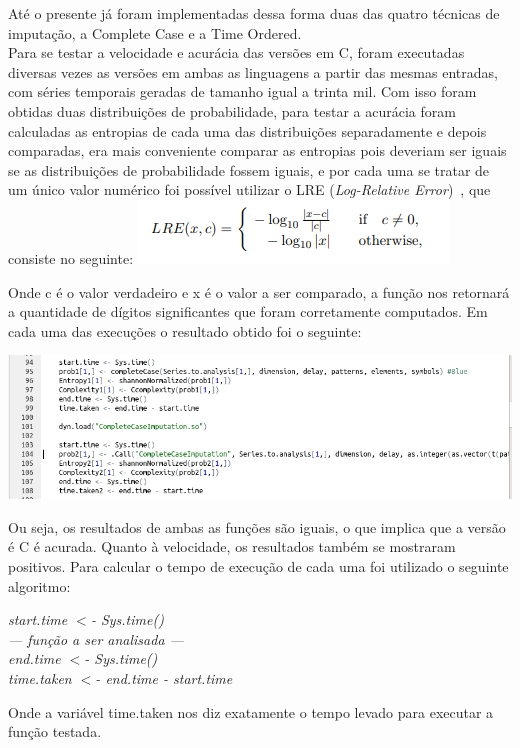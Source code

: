 \documentclass{article}
\begin{document}
Até o presente já foram implementadas dessa forma duas das quatro técnicas de imputação, a Complete Case e a Time Ordered. \\
Para se testar a velocidade e acurácia das versões em C, foram executadas diversas vezes as versões em ambas as linguagens a partir das mesmas entradas, com séries temporais geradas de tamanho igual a trinta mil. Com isso foram obtidas duas distribuições de probabilidade, para testar a acurácia foram calculadas as entropias de cada uma das distribuições separadamente e depois comparadas, era mais conveniente comparar as entropias pois deveriam ser iguais se as distribuições de probabilidade fossem iguais, e por cada uma se tratar de um único valor numérico foi possível utilizar o LRE (\textit{Log-Relative Error})~\cite{almiron2010numerical}, que consiste no seguinte:
\includegraphics[width=0.50\columnwidth]{LRE1.png}

Onde c é o valor verdadeiro e x é o valor a ser comparado, a função nos retornará a quantidade de dígitos significantes que foram corretamente computados. Em cada uma das execuções o resultado obtido foi o seguinte:

    
\includegraphics[width=0.80\columnwidth]{LRE.png}


Ou seja, os resultados de ambas as funções são iguais, o que implica que a versão é C é acurada.
Quanto à velocidade, os resultados também se mostraram positivos. Para calcular o tempo de execução de cada uma foi utilizado o seguinte algoritmo:
    
\begin{flushleft}
\textit{start.time $<$- Sys.time()\\
--- função a ser analisada ---\\
end.time $<$- Sys.time()\\
time.taken $<$- end.time - start.time\\}
\end{flushleft}

Onde a variável time.taken nos diz exatamente o tempo levado para executar a função testada.
\end{document}
